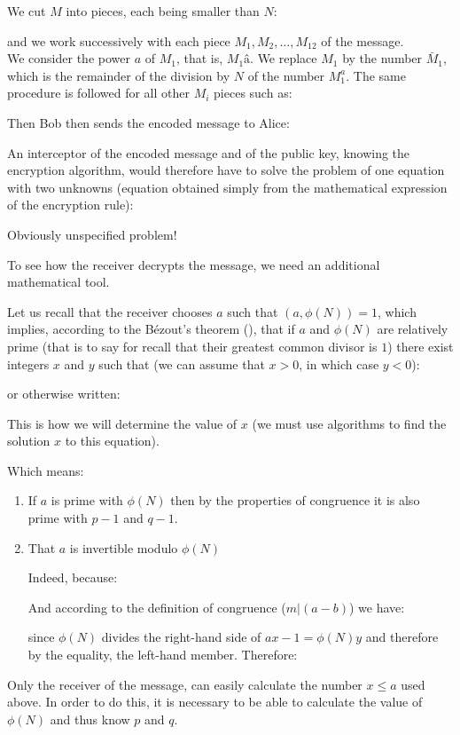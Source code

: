 	\begin{tcolorbox}[colframe=black,colback=white,sharp corners]
	We cut $M$ into pieces, each being smaller than $N$:
	
	and we work successively with each piece $M_1,M_2,\ldots,M_{12}$ of the message.\\
	
	We consider the power $a$ of $M_1$, that is, $M_1â$. We replace $M_1$ by the number $\bar{M}_1$, which is the remainder of the division by $N$ of the number $M_1^a$. The same procedure is followed for all other $M_i$ pieces such as:
	
	Then Bob then sends the encoded message to Alice:
	
	An interceptor of the encoded message and of the public key, knowing the encryption algorithm, would therefore have to solve the problem of one equation with two unknowns (equation obtained simply from the mathematical expression of the encryption rule):
	
	Obviously unspecified problem!
	\end{tcolorbox}
	To see how the receiver decrypts the message, we need an additional mathematical tool.

	Let us recall that the receiver chooses $a$ such that $(a,\phi(N))=1$, which implies, according to the Bézout's theorem (), that if $a$ and $\phi(N)$ are relatively prime (that is to say for recall that their greatest common divisor is $1$) there exist integers $x$ and $y$ such that (we can assume that $x>0$, in which case $y<0$):
	
	or otherwise written:
	
	This is how we will determine the value of $x$ (we must use algorithms to find the solution $x$ to this equation).
	
	Which means:
	\begin{enumerate}
		\item If $a$ is prime with $\phi(N)$ then by the properties of congruence it is also prime with $p-1$ and $q-1$.
	
		\item That $a$ is invertible modulo $\phi(N)$
	
		Indeed, because:
		
		And according to the definition of congruence ($m|(a-b)$) we have:
		
		since $\phi(N)$ divides the right-hand side of $ax-1=\phi(N)y$ and therefore by the equality, the left-hand member. Therefore:
		
	\end{enumerate}
	Only the receiver of the message, can easily calculate the number $x\le a$ used above. In order to do this, it is necessary to be able to calculate the value of $\phi(N)$ and thus know $p$ and $q$.

